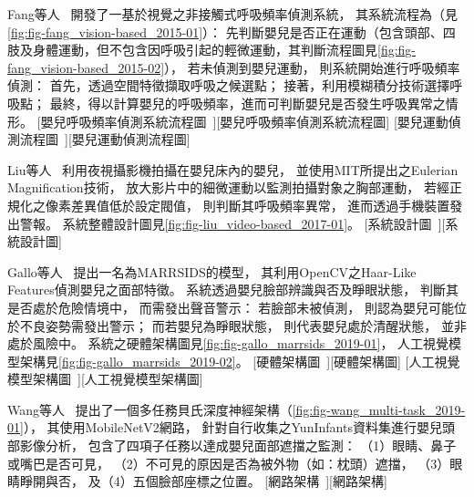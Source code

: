 \documentclass[class=NCU_thesis, crop=false]{standalone}
\begin{document}
Fang等人~\cite{fang_vision-based_2015}
開發了一基於視覺之非接觸式呼吸頻率偵測系統，
其系統流程為（見\cref{fig:fig-fang_vision-based_2015-01}）：
先判斷嬰兒是否正在運動（包含頭部、四肢及身體運動，但不包含因呼吸引起的輕微運動，其判斷流程圖見\cref{fig:fig-fang_vision-based_2015-02}），
若未偵測到嬰兒運動，
則系統開始進行呼吸頻率偵測：
首先，透過空間特徵擷取呼吸之候選點；
接著，利用模糊積分技術選擇呼吸點；
最終，得以計算嬰兒的呼吸頻率，進而可判斷嬰兒是否發生呼吸異常之情形。
[嬰兒呼吸頻率偵測系統流程圖~\cite{fang_vision-based_2015}][嬰兒呼吸頻率偵測系統流程圖]
[嬰兒運動偵測流程圖~\cite{fang_vision-based_2015}][嬰兒運動偵測流程圖]

Liu等人~\cite{liu_video-based_2017}
利用夜視攝影機拍攝在嬰兒床內的嬰兒，
並使用MIT所提出之Eulerian Magnification技術，
放大影片中的細微運動以監測拍攝對象之胸部運動，
若經正規化之像素差異值低於設定閥值，
則判斷其呼吸頻率異常，
進而透過手機裝置發出警報。
系統整體設計圖見\cref{fig:fig-liu_video-based_2017-01}。
[系統設計圖~\cite{liu_video-based_2017}][系統設計圖]

Gallo等人~\cite{gallo_marrsids_2019}
提出一名為MARRSIDS的模型，
其利用OpenCV之Haar-Like Features偵測嬰兒之面部特徵。
系統透過嬰兒臉部辨識與否及睜眼狀態，
判斷其是否處於危險情境中，
而需發出聲音警示：
若臉部未被偵測，
則認為嬰兒可能位於不良姿勢需發出警示；
而若嬰兒為睜眼狀態，
則代表嬰兒處於清醒狀態，
並非處於風險中。
系統之硬體架構圖見\cref{fig:fig-gallo_marrsids_2019-01}，
人工視覺模型架構見\cref{fig:fig-gallo_marrsids_2019-02}。
[硬體架構圖~\cite{gallo_marrsids_2019}][硬體架構圖]
[人工視覺模型架構圖~\cite{gallo_marrsids_2019}][人工視覺模型架構圖]

Wang等人~\cite{wang_multi-task_2019}
提出了一個多任務貝氏深度神經架構（\cref{fig:fig-wang_multi-task_2019-01}），
其使用MobileNetV2網路，
針對自行收集之YunInfants資料集進行嬰兒頭部影像分析，
包含了四項子任務以達成嬰兒面部遮擋之監測：
（1）眼睛、鼻子或嘴巴是否可見，
（2）不可見的原因是否為被外物（如：枕頭）遮擋，
（3）眼睛睜開與否，
及（4）五個臉部座標之位置。
[網路架構~\cite{wang_multi-task_2019}][網路架構]
\end{document}
